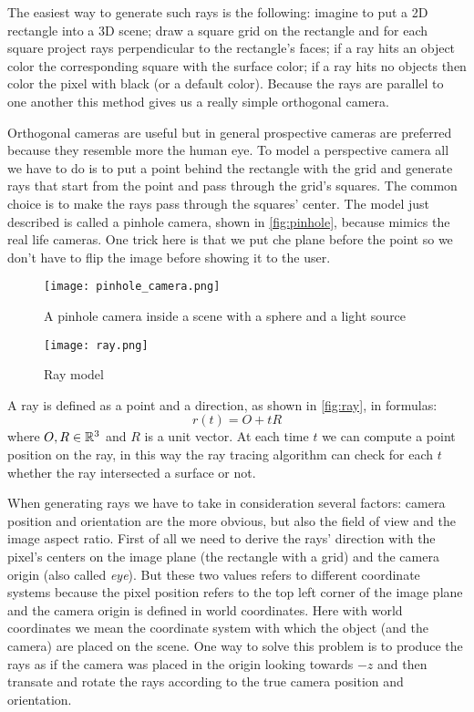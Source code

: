 The easiest way to generate such rays is the following:
imagine to put a 2D rectangle into a 3D scene;
draw a square grid on the rectangle and for each square project rays perpendicular to the rectangle's faces;
if a ray hits an object color the corresponding square with the surface color;
if a ray hits no objects then color the pixel with black (or a default color).
Because the rays are parallel to one another this method gives us a really simple orthogonal camera.

Orthogonal cameras are useful but in general prospective cameras are preferred because they resemble more the human eye.
To model a perspective camera all we have to do is to put a point behind the rectangle with the grid and generate rays that start from the point and pass through the grid's squares.
The common choice is to make the rays pass through the squares' center. %
The model just described is called a pinhole camera, shown in \autoref{fig:pinhole}, because mimics the real life cameras.
One trick here is that we put che plane before the point so we don't have to flip the image before showing it to the user.
\begin{figure}[!htb]
  \texttt{[image: pinhole\_camera.png]}
  \caption{A pinhole camera inside a scene with a sphere and a light source}
  \label{fig:pinhole}
\endminipage\hfill
{}
  \texttt{[image: ray.png]}
  \caption{Ray model}
  \label{fig:ray}
\endminipage
\end{figure}

A ray is defined as a point and a direction, as shown in \autoref{fig:ray},
in formulas:
$$
r(t) = O + tR
$$
where $O,R \in \mathbb{R}^3$ and $R$ is a unit vector.
At each time $t$ we can compute a point position on the ray, in this way the ray tracing algorithm can check for each $t$ whether the ray intersected a surface or not.


When generating rays we have to take in consideration several factors:
camera position and orientation are the more obvious, but also the field of view and the image aspect ratio.
First of all we need to derive the rays' direction with the pixel's centers on the image plane (the rectangle with a grid) and the camera origin (also called \emph{eye}).
But these two values refers to different coordinate systems because the pixel position refers to the top left corner of the image plane and the camera origin is defined in world coordinates.
Here with world coordinates we mean the coordinate system with which the object (and the camera) are placed on the scene.
One way to solve this problem is to produce the rays as if the camera was placed in the origin looking towards $-z$ and then transate and rotate the rays according to the true camera position and orientation.

